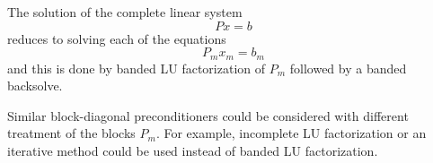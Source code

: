 {The solution of the complete linear system
\begin{equation}
  Px = b
\end{equation}
reduces to solving each of the equations 
\begin{equation}
  P_m x_m = b_m
\end{equation}
and this is done by banded LU factorization of $P_m$ followed by a banded
backsolve.

Similar block-diagonal preconditioners could be considered with different
treatment of the blocks $P_m$. For example, incomplete LU factorization or
an iterative method could be used instead of banded LU factorization.


}
